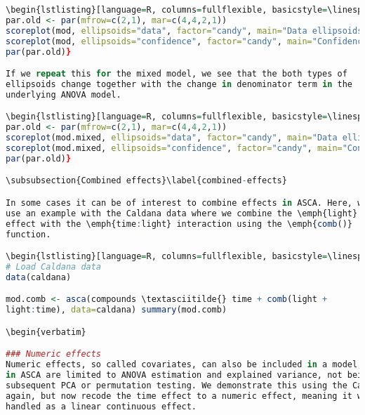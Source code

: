 \begin{lstlisting}[language=R, columns=fullflexible, basicstyle=\linespread{0.85}\small\ttfamily, stringstyle=\color{DarkGreen}, keywordstyle=\color{blue}, commentstyle=\color{DarkGreen},]
\begin{lstlisting}[language=R, columns=fullflexible, basicstyle=\linespread{0.85}\small\ttfamily, stringstyle=\color{DarkGreen}, keywordstyle=\color{blue}, commentstyle=\color{DarkGreen},]
par.old <- par(mfrow=c(2,1), mar=c(4,4,2,1))
scoreplot(mod, ellipsoids="data", factor="candy", main="Data ellipsoids")
scoreplot(mod, ellipsoids="confidence", factor="candy", main="Confidence ellipsoids")
par(par.old)}

If we repeat this for the mixed model, we see that the both types of
ellipsoids change together with the change in denominator term in the
underlying ANOVA model.

\begin{lstlisting}[language=R, columns=fullflexible, basicstyle=\linespread{0.85}\small\ttfamily, stringstyle=\color{DarkGreen}, keywordstyle=\color{blue}, commentstyle=\color{DarkGreen},]
par.old <- par(mfrow=c(2,1), mar=c(4,4,2,1))
scoreplot(mod.mixed, ellipsoids="data", factor="candy", main="Data ellipsoids")
scoreplot(mod.mixed, ellipsoids="confidence", factor="candy", main="Confidence ellipsoids")
par(par.old)}

\subsubsection{Combined effects}\label{combined-effects}

In some cases it can be of interest to combine effects in ASCA. Here, we
use an example with the Caldana data where we combine the \emph{light}
effect with the \emph{time:light} interaction using the \emph{comb()}
function.

\begin{lstlisting}[language=R, columns=fullflexible, basicstyle=\linespread{0.85}\small\ttfamily, stringstyle=\color{DarkGreen}, keywordstyle=\color{blue}, commentstyle=\color{DarkGreen},]
# Load Caldana data
data(caldana)

mod.comb <- asca(compounds \textasciitilde{} time + comb(light +
light:time), data=caldana) summary(mod.comb)

\begin{verbatim}

### Numeric effects
Numeric effects, so called covariates, can also be included in a model, though their
in ASCA are limited to ANOVA estimation and explained variance, not being used in
subsequent PCA or permutation testing. We demonstrate this using the Caldana data
again, but now recode the time effect to a numeric effect, meaning it will be
handled as a linear continuous effect.


\end{lstlisting}
